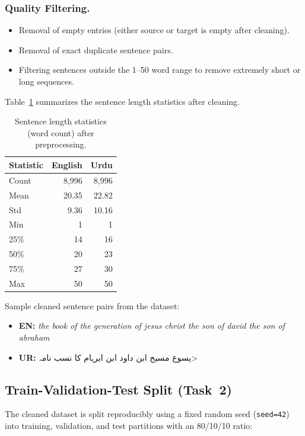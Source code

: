 \documentclass[runningheads]{llncs}
\begin{document}
\subsubsection{Quality Filtering.}
\begin{itemize}
    \item Removal of empty entries (either source or target is empty after cleaning).
    \item Removal of exact duplicate sentence pairs.
    \item Filtering sentences outside the 1--50 word range to remove extremely short or long sequences.
\end{itemize}

Table~\ref{tab:sentence_stats} summarizes the sentence length statistics after cleaning.

\begin{table}[H]
\centering
\caption{Sentence length statistics (word count) after preprocessing.}
\label{tab:sentence_stats}
\begin{tabular}{@{}lrr@{}}
\toprule
\textbf{Statistic} & \textbf{English} & \textbf{Urdu} \\
\midrule
Count & 8,996 & 8,996 \\
Mean  & 20.35 & 22.82 \\
Std   & 9.36  & 10.16 \\
Min   & 1     & 1 \\
25\%  & 14    & 16 \\
50\%  & 20    & 23 \\
75\%  & 27    & 30 \\
Max   & 50    & 50 \\
\bottomrule
\end{tabular}
\end{table}

Sample cleaned sentence pairs from the dataset:
\begin{itemize}
    \item \textbf{EN:} \textit{the book of the generation of jesus christ the son of david the son of abraham}
    \item \textbf{UR:} \<یسوع مسیح ابن داود ابن ابرہام کا نسب نامہ>
\end{itemize}

\subsection{Train-Validation-Test Split (Task~2)}

The cleaned dataset is split reproducibly using a fixed random seed (\texttt{seed=42}) into training, validation, and test partitions with an 80/10/10 ratio:
\end{document}
